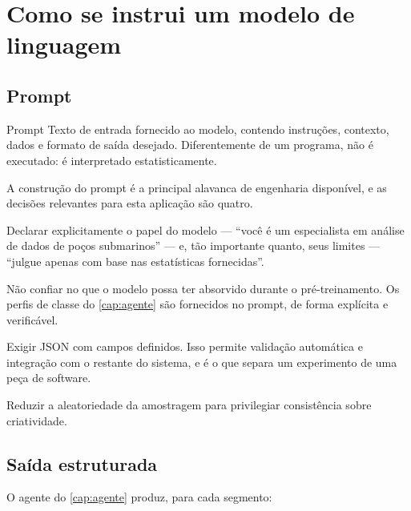 \section{Como se instrui um modelo de linguagem}

\subsection{Prompt}

\begin{definicao}{Prompt}
Texto de entrada fornecido ao modelo, contendo instruções, contexto, dados e formato de
saída desejado. Diferentemente de um programa, não é executado: é interpretado
estatisticamente.
\end{definicao}

A construção do prompt é a principal alavanca de engenharia disponível, e as decisões
relevantes para esta aplicação são quatro.

\begin{description}[leftmargin=0pt,style=nextline,itemsep=0.4em]

\item[Papel e escopo.] Declarar explicitamente o papel do modelo --- ``você é um
especialista em análise de dados de poços submarinos'' --- e, tão importante quanto,
seus limites --- ``julgue apenas com base nas estatísticas fornecidas''.

\item[Conhecimento de domínio explícito.] Não confiar no que o modelo possa ter
absorvido durante o pré-treinamento. Os perfis de classe do \cref{cap:agente} são
fornecidos no prompt, de forma explícita e verificável.

\item[Formato de saída estruturado.] Exigir JSON com campos definidos. Isso permite
validação automática e integração com o restante do sistema, e é o que separa um
experimento de uma peça de software.

\item[Temperatura baixa.] Reduzir a aleatoriedade da amostragem para privilegiar
consistência sobre criatividade.

\end{description}

\subsection{Saída estruturada}

O agente do \cref{cap:agente} produz, para cada segmento:

